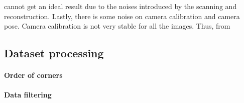 cannot get an ideal result due to the noises introduced by the scanning and reconstruction. Lastly, there is some noise on camera calibration and camera pose. Camera calibration is not very stable for all the images. Thus, from 


 
\subsection{Dataset processing}

\paragraph{Order of corners}
\paragraph{Data filtering}

